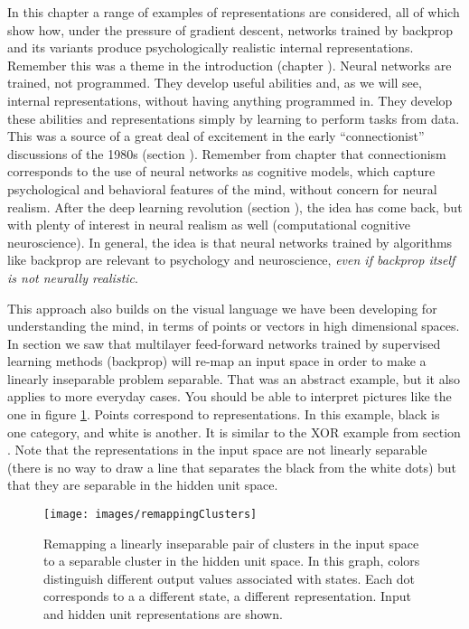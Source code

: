 In this chapter a range of examples of representations are considered, all of which show how, under the pressure of gradient descent, networks trained by backprop and its variants produce psychologically realistic internal representations. Remember this was a theme in the introduction (chapter ). Neural networks are trained, not programmed. They develop useful abilities and, as we will see, internal representations, without having anything programmed in. They develop these abilities and representations simply by learning to perform tasks from data. This was a source of a great deal of excitement in the early ``connectionist'' discussions of the 1980s (section ). Remember from chapter  that connectionism corresponds to the use of neural networks as cognitive models, which capture psychological and behavioral features of the mind, without concern for neural realism. After the deep learning revolution (section ), the idea has come back, but with plenty of interest in neural realism as well (computational cognitive neuroscience).  In general, the idea is that neural networks trained by algorithms like backprop are relevant to psychology and neuroscience, \emph{even if backprop itself is not neurally realistic}.

This approach also builds on the visual language we have been developing for understanding the mind, in terms of points or vectors in high dimensional spaces. In section  we saw that multilayer feed-forward networks trained by supervised learning methods (\eg backprop) will re-map an input space in order to make a linearly inseparable problem separable. That was an abstract example, but it also applies to more everyday cases. You should be able to interpret pictures like the one in figure \ref{remappingClusters}.  Points correspond to representations. In this example, black is one category, and white is another. It is similar to the XOR example from section .  Note that the representations in the input space are not linearly separable (there is no way to draw a line that separates the black from the white dots) but that they are separable in the hidden unit space.
\begin{figure}[h]
\centering
\texttt{[image: images/remappingClusters]}
\caption[Jeff Yoshimi.]{Remapping a linearly inseparable pair of clusters in the input space to a separable cluster in the hidden unit space. In this graph, colors distinguish different output values associated with states. Each dot corresponds to a a different state, a different representation. Input and hidden unit representations are shown.}
\label{remappingClusters}
\end{figure}

